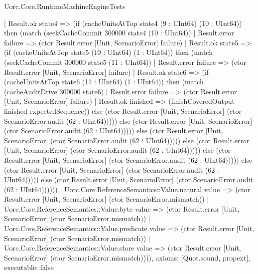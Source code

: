 \begin{lexlean}{Uorc.Core.RuntimeMachineEngineTests}
\begin{semanticmodule}
{                  | Result.ok state4 => (if (cacheUnitsAtTop state4 (9 : UInt64) (10 : UInt64)) then (match (seekCacheCommit 300000 state4 (10 : UInt64))
                    | Result.error failure => (ctor Result.error [Unit, ScenarioError] failure)
                    | Result.ok state5 => (if (cacheUnitsAtTop state5 (10 : UInt64) (1 : UInt64)) then (match (seekCacheCommit 300000 state5 (11 : UInt64))
                      | Result.error failure => (ctor Result.error [Unit, ScenarioError] failure)
                      | Result.ok state6 => (if (cacheUnitsAtTop state6 (11 : UInt64) (1 : UInt64)) then (match (cacheAuditDrive 300000 state6)
                        | Result.error failure => (ctor Result.error [Unit, ScenarioError] failure)
                        | Result.ok finished => (finishCoveredOutput finished expectedSequence)) else (ctor Result.error [Unit, ScenarioError] (ctor ScenarioError.audit (62 : UInt64))))) else (ctor Result.error [Unit, ScenarioError] (ctor ScenarioError.audit (62 : UInt64))))) else (ctor Result.error [Unit, ScenarioError] (ctor ScenarioError.audit (62 : UInt64))))) else (ctor Result.error [Unit, ScenarioError] (ctor ScenarioError.audit (62 : UInt64))))) else (ctor Result.error [Unit, ScenarioError] (ctor ScenarioError.audit (62 : UInt64))))) else (ctor Result.error [Unit, ScenarioError] (ctor ScenarioError.audit (62 : UInt64))))) else (ctor Result.error [Unit, ScenarioError] (ctor ScenarioError.audit (62 : UInt64))))))
      | Uorc.Core.ReferenceSemantics::Value.natural value => (ctor Result.error [Unit, ScenarioError] (ctor ScenarioError.mismatch))
      | Uorc.Core.ReferenceSemantics::Value.byte value => (ctor Result.error [Unit, ScenarioError] (ctor ScenarioError.mismatch))
      | Uorc.Core.ReferenceSemantics::Value.predicate value => (ctor Result.error [Unit, ScenarioError] (ctor ScenarioError.mismatch))
      | Uorc.Core.ReferenceSemantics::Value.store value => (ctor Result.error [Unit, ScenarioError] (ctor ScenarioError.mismatch)))),
  axioms: [Quot.sound, propext],
  executable: false
}


\end{semanticmodule}
\end{lexlean}
